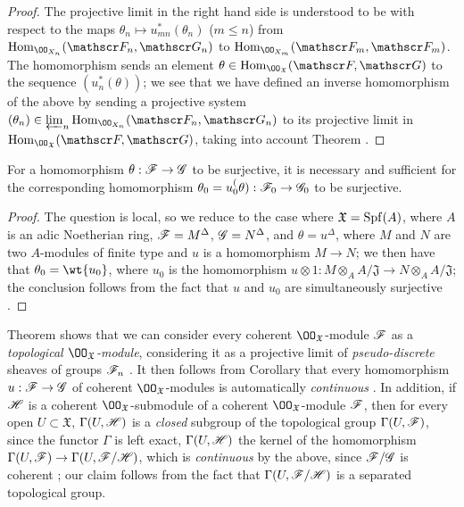 \begin{proof}
\label{proof-1.10.11.4}
The projective limit in the right hand side is understood to be with respect to the maps $\theta_n\mapsto u_{mn}^*(\theta_n)$ ($m\leq n$) from $\Hom_{\OO_{X_n}}(\sh{F}_n,\sh{G}_n)$ to $\Hom_{\OO_{X_m}}(\sh{F}_m,\sh{F}_m)$.
The homomorphism  sends an element $\theta\in\Hom_{\OO_\mathfrak{X}}(\sh{F},\sh{G})$ to the sequence $(u_n^*(\theta))$; we see that we have defined an inverse homomorphism of the above by sending a projective system $(\theta_n)\in\varprojlim_n\Hom_{\OO_{X_n}}(\sh{F}_n,\sh{G}_n)$ to its projective limit in $\Hom_{\OO_\mathfrak{X}}(\sh{F},\sh{G})$, taking into account Theorem .
\end{proof}

\begin{cor}[10.11.5]
\label{1.10.11.5}
For a homomorphism $\theta:\sh{F}\to\sh{G}$ to be surjective, it is necessary and sufficient for the corresponding homomorphism $\theta_0=u_0^(\theta):\sh{F}_0\to\sh{G}_0$ to be surjective.
\end{cor}

\begin{proof}
\label{proof-1.10.11.5}
The question is local, so we reduce to the case where $\mathfrak{X}=\operatorname{Spf}(A)$, where $A$ is an adic Noetherian ring, $\mathscr{F}=M^\Delta$, $\mathscr{G}=N^\Delta$, and $\theta=u^\Delta$, where $M$ and $N$ are two $A$-modules of finite type and $u$ is a homomorphism $M\to N$; we then have that $\theta_0=\wt{u_0}$, where $u_0$ is the homomorphism $u\otimes 1:M\otimes_A A/\mathfrak{J}\to N\otimes_A A/\mathfrak{J}$; the conclusion follows from the fact that $u$ and $u_0$ are simultaneously surjective .
\end{proof}

\begin{env}[10.11.6]
\label{1.10.11.6}
Theorem  shows that we can consider every coherent $\OO_\mathfrak{X}$-module $\mathscr{F}$ as a \emph{topological $\OO_\mathfrak{X}$-module}, considering it as a projective limit of \emph{pseudo-discrete} sheaves of groups $\mathscr{F}_n$ .
It then follows from Corollary  that every homomorphism $u:\sh{F}\to\sh{G}$ of coherent $\OO_\mathfrak{X}$-modules is automatically \emph{continuous}
.
In addition, if $\mathscr{H}$ is a coherent $\OO_\mathfrak{X}$-submodule of a coherent $\OO_\mathfrak{X}$-module $\mathscr{F}$, then for every open $U\subset\mathfrak{X}$, $\Gamma(U,\mathscr{H})$ is a \emph{closed} subgroup of the topological group $\Gamma(U,\mathscr{F})$, since the functor $\Gamma$ is left exact, $\Gamma(U,\mathscr{H})$ the kernel of the homomorphism $\Gamma(U,\sh{F})\to\Gamma(U,\sh{F}/\sh{H})$, which is \emph{continuous} by the above, since $\mathscr{F}/\mathscr{G}$ is coherent ; our claim follows from the fact that $\Gamma(U,\mathscr{F}/\mathscr{H})$ is a separated topological group.
\end{env}

